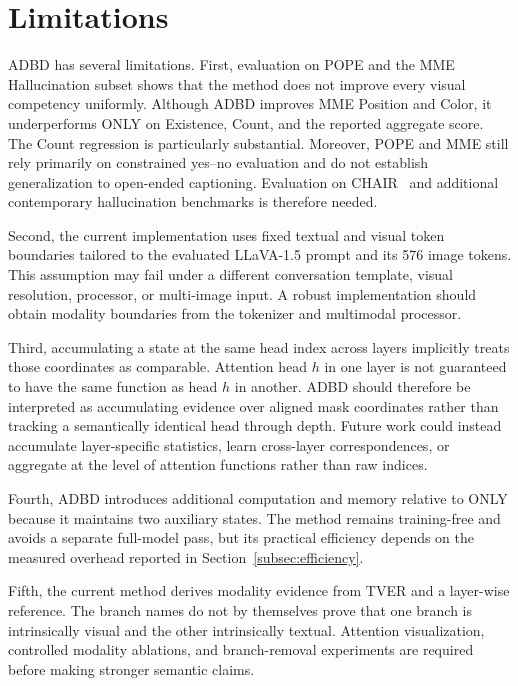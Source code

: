 \section{Limitations}
\label{sec:limitations}

ADBD has several limitations. First, evaluation on POPE and the MME Hallucination subset shows that the method does not improve every visual competency uniformly. Although ADBD improves MME Position and Color, it underperforms ONLY on Existence, Count, and the reported aggregate score. The Count regression is particularly substantial. Moreover, POPE and MME still rely primarily on constrained yes--no evaluation and do not establish generalization to open-ended captioning. Evaluation on CHAIR~\cite{rohrbach2018object} and additional contemporary hallucination benchmarks is therefore needed.

Second, the current implementation uses fixed textual and visual token boundaries tailored to the evaluated LLaVA-1.5 prompt and its 576 image tokens. This assumption may fail under a different conversation template, visual resolution, processor, or multi-image input. A robust implementation should obtain modality boundaries from the tokenizer and multimodal processor.

Third, accumulating a state at the same head index across layers implicitly treats those coordinates as comparable. Attention head $h$ in one layer is not guaranteed to have the same function as head $h$ in another. ADBD should therefore be interpreted as accumulating evidence over aligned mask coordinates rather than tracking a semantically identical head through depth. Future work could instead accumulate layer-specific statistics, learn cross-layer correspondences, or aggregate at the level of attention functions rather than raw indices.

Fourth, ADBD introduces additional computation and memory relative to ONLY because it maintains two auxiliary states. The method remains training-free and avoids a separate full-model pass, but its practical efficiency depends on the measured overhead reported in Section~\ref{subsec:efficiency}.

Fifth, the current method derives modality evidence from TVER and a layer-wise reference. The branch names do not by themselves prove that one branch is intrinsically visual and the other intrinsically textual. Attention visualization, controlled modality ablations, and branch-removal experiments are required before making stronger semantic claims.

